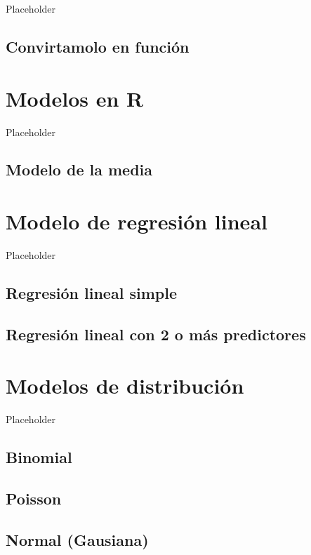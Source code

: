 \documentclass[
]{book}
\begin{document}
Placeholder

\hypertarget{convirtamolo-en-funciuxf3n}{%
\section{Convirtamolo en función}\label{convirtamolo-en-funciuxf3n}}

\hypertarget{modelos-en-r}{%
\chapter{Modelos en R}\label{modelos-en-r}}

Placeholder

\hypertarget{modelo-de-la-media}{%
\section{Modelo de la media}\label{modelo-de-la-media}}

\hypertarget{modelo-de-regresiuxf3n-lineal}{%
\chapter{Modelo de regresión lineal}\label{modelo-de-regresiuxf3n-lineal}}

Placeholder

\hypertarget{regresiuxf3n-lineal-simple}{%
\section{Regresión lineal simple}\label{regresiuxf3n-lineal-simple}}

\hypertarget{regresiuxf3n-lineal-con-2-o-muxe1s-predictores}{%
\section{Regresión lineal con 2 o más predictores}\label{regresiuxf3n-lineal-con-2-o-muxe1s-predictores}}

\hypertarget{modelos-de-distribuciuxf3n}{%
\chapter{Modelos de distribución}\label{modelos-de-distribuciuxf3n}}

Placeholder

\hypertarget{binomial}{%
\section{Binomial}\label{binomial}}

\hypertarget{poisson}{%
\section{Poisson}\label{poisson}}

\hypertarget{normal-gausiana}{%
\section{Normal (Gausiana)}\label{normal-gausiana}}

  
\end{document}
